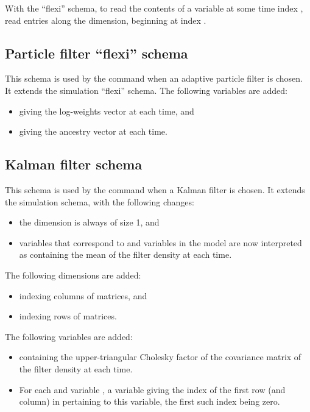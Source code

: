 \begin{tip}
With the ``flexi'' schema, to read the contents of a variable at some time
index , read  entries along the 
dimension, beginning at index .
\end{tip}

\subsection{Particle filter ``flexi'' schema}

This schema is used by the  command when an adaptive
particle filter is chosen. It extends the simulation ``flexi'' schema. The
following variables are added:
\begin{itemize}
\item {} giving the log-weights vector at each time, and
\item {} giving the ancestry vector at each time.
\end{itemize}

\subsection{Kalman filter schema}

This schema is used by the  command when a Kalman filter is
chosen. It extends the simulation schema, with the following changes:
\begin{itemize}
\item the  dimension is always of size 1, and
\item variables that correspond to  and  variables
  in the model are now interpreted as containing the mean of the filter
  density at each time.
\end{itemize}

The following dimensions are added:
\begin{itemize}
\item {} indexing columns of matrices, and
\item {} indexing rows of matrices.
\end{itemize}

The following variables are added:
\begin{itemize}
\item {} containing the upper-triangular Cholesky
  factor of the covariance matrix of the filter density at each time.
\item For each  and  variable , a
  variable  giving the index of the first row (and
  column) in  pertaining to this variable, the first such index being
  zero.
\end{itemize}

